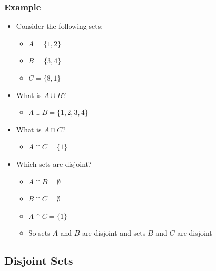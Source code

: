 \documentclass[
  10pt,
  english,
  letterpaper,
,tablecaptionabove
]{scrartcl}
\providecommand{\tightlist}{%
  \setlength{\itemsep}{0pt}\setlength{\parskip}{0pt}}
\begin{document}
\hypertarget{example}{%
\subsubsection{Example}\label{example}}

\begin{itemize}
\tightlist
\item
  Consider the following sets:

  \begin{itemize}
  \tightlist
  \item
    \(A = \{1, 2\}\)
  \item
    \(B = \{3, 4\}\)
  \item
    \(C = \{8, 1\}\)
  \end{itemize}
\item
  What is \(A\cup B\)?

  \begin{itemize}
  \tightlist
  \item
    \(A\cup B = \{1, 2, 3, 4\}\)
  \end{itemize}
\item
  What is \(A\cap C\)?

  \begin{itemize}
  \tightlist
  \item
    \(A\cap C = \{1\}\)
  \end{itemize}
\item
  Which sets are disjoint?

  \begin{itemize}
  \tightlist
  \item
    \(A\cap B = \emptyset\)
  \item
    \(B\cap C = \emptyset\)
  \item
    \(A\cap C = \{1\}\)
  \item
    So sets \(A\) and \(B\) are disjoint and sets \(B\) and \(C\) are
    disjoint
  \end{itemize}
\end{itemize}

\hypertarget{disjoint-sets}{%
\subsection{Disjoint Sets}\label{disjoint-sets}}
\end{document}
